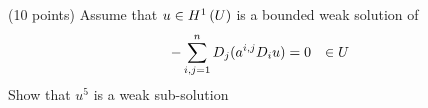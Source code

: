 (10 points)
Assume that $u \in H^{1}\left(U \right)$ is a bounded weak solution of
\begin{align*}
  -\sum_{i, j = 1}^n D_{j} (a^{i, j} D_{i} u) = 0 & & \in U
\end{align*}
Show that $u^5$ is a weak sub-solution
